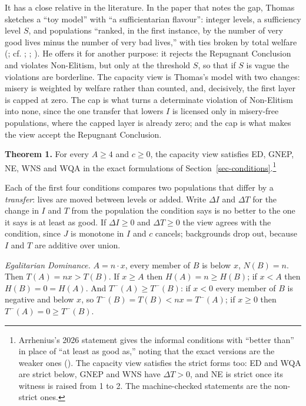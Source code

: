 \documentclass[
  11pt,
  letterpaper,
  DIV=11,
  numbers=noendperiod,
  twoside]{scrartcl}
\newcounter{none} %
\begin{document}
It has a close relative in the literature. In the paper that notes the
gap, Thomas sketches a ``toy model'' with ``a sufficientarian flavour'':
integer levels, a sufficiency level \(S\), and populations ``ranked, in
the first instance, by the number of very good lives minus the number of
very bad lives,'' with ties broken by total welfare
(; cf.
;
; ). He offers it for another purpose: it rejects the Repugnant
Conclusion and violates Non-Elitism, but only at the threshold \(S\), so
that if \(S\) is vague the violations are borderline. The capacity view
is Thomas's model with two changes: misery is weighted by welfare rather
than counted, and, decisively, the first layer is capped at zero. The
cap is what turns a determinate violation of Non-Elitism into none,
since the one transfer that lowers \(I\) is licensed only in misery-free
populations, where the capped layer is already zero; and the cap is what
makes the view accept the Repugnant Conclusion.

\textbf{Theorem 1.} For every \(A \geq 4\) and \(c \geq 0\), the
capacity view satisfies ED, GNEP, NE, WNS and WQA in the exact
formulations of Section~\ref{sec-conditions}.\footnote{Arrhenius's 2026
  statement gives the informal conditions with ``better than'' in place
  of ``at least as good as,'' noting that the exact versions are the
  weaker ones (). The
  capacity view satisfies the strict forms too: ED and WQA are strict
  below, GNEP and WNS have \(\Delta T > 0\), and NE is strict once its
  witness is raised from 1 to 2. The machine-checked statements are the
  non-strict ones.}

Each of the first four conditions compares two populations that differ
by a \emph{transfer}: lives are moved between levels or added. Write
\(\Delta I\) and \(\Delta T\) for the change in \(I\) and \(T\) from the
population the condition says is no better to the one it says is at
least as good. If \(\Delta I \geq 0\) and \(\Delta T \geq 0\) the view
agrees with the condition, since \(J\) is monotone in \(I\) and \(c\)
cancels; backgrounds drop out, because \(I\) and \(T\) are additive over
union.

\emph{Egalitarian Dominance.} \(A = n \cdot x\), every member of \(B\)
is below \(x\), \(N(B) = n\). Then \(T(A) = nx > T(B)\). If \(x \geq A\)
then \(H(A) = n \geq H(B)\); if \(x < A\) then \(H(B) = 0 = H(A)\). And
\(T^-(A) \geq T^-(B)\): if \(x < 0\) every member of \(B\) is negative
and below \(x\), so \(T^-(B) = T(B) < nx = T^-(A)\); if \(x \geq 0\)
then \(T^-(A) = 0 \geq T^-(B)\).
\end{document}
